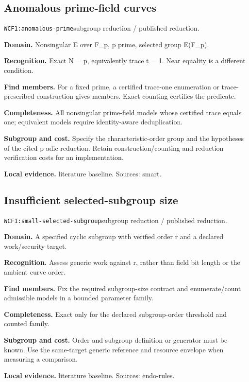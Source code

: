 \documentclass[10pt]{article}
\begin{document}
\subsection{Anomalous prime-field curves}
\texttt{WCF1:anomalous-prime}\quad subgroup reduction / published reduction.\par
\textbf{Domain.} Nonsingular E over F\_p, p prime, selected group E(F\_p).\par
\textbf{Recognition.} Exact N = p, equivalently trace t = 1. Near equality is a different condition.\par
\textbf{Find members.} For a fixed prime, a certified trace-one enumeration or trace-prescribed construction gives members. Exact counting certifies the predicate.\par
\textbf{Completeness.} All nonsingular prime-field models whose certified trace equals one; equivalent models require identity-aware deduplication.\par
\textbf{Subgroup and cost.} Specify the characteristic-order group and the hypotheses of the cited p-adic reduction. Retain construction/counting and reduction verification costs for an implementation.\par
\textbf{Local evidence.} literature baseline. Sources: smart.
\subsection{Insufficient selected-subgroup size}
\texttt{WCF1:small-selected-subgroup}\quad subgroup reduction / published reduction.\par
\textbf{Domain.} A specified cyclic subgroup with verified order r and a declared work/security target.\par
\textbf{Recognition.} Assess generic work against r, rather than field bit length or the ambient curve order.\par
\textbf{Find members.} Fix the required subgroup-size contract and enumerate/count admissible models in a bounded parameter family.\par
\textbf{Completeness.} Exact only for the declared subgroup-order threshold and counted family.\par
\textbf{Subgroup and cost.} Order and subgroup definition or generator must be known. Use the same-target generic reference and resource envelope when measuring a comparison.\par
\textbf{Local evidence.} literature baseline. Sources: endo-rules.
\end{document}
